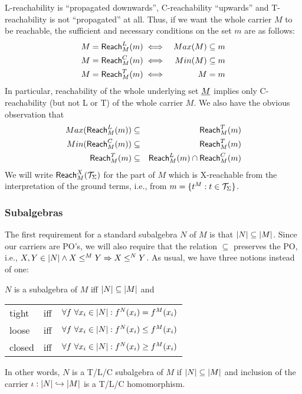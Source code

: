 L-reachability is ``propagated downwards'', C-reachability ``upwards''
and T-reachability is not ``propagated'' at all. Thus, if we want the
whole carrier $M$ to be reachable, the sufficient and necessary conditions
on the set $m$ are as follows:
\begin{eqnarray}
M = \reach LmM & \iff & Max(M)\subseteq m \\
M = \reach CmM & \iff & Min(M) \subseteq m \\
M = \reach TmM & \iff & M = m
\end{eqnarray} 
In particular, reachability of the whole underlying set $\under M$
implies only C-reachability (but not L or T) of the whole carrier $M$.
We also have the obvious observation that
\begin{eqnarray}
Max(\reach LmM) & \subseteq & \reach TmM \\
Min(\reach CmM) & \subseteq & \reach TmM \\
\reach TmM & \subseteq & \reach LmM \cap \reach CmM
\end{eqnarray}
We will write $\reach X{\GTerms}M$ for the part of $M$ which is
X-reachable from the interpretation of the ground terms, i.e., from
$m=\{t^M:t\in\GTerms\}$.

\subsubsection{Subalgebras}

The first requirement for a standard subalgebra $N$ of $M$ is that
$\Card N\subseteq\Card M$. Since our carriers are PO's, we will also
require that the relation $\subseteq$ preserves the PO, i.e.,
$X,Y\in\Card N \land X\po^M Y\impl X\po^N Y$.
As usual,
we have three notions instead of one:
\begin{Definition}
$N$ is a
subalgebra of $M$ iff $\Card N\subseteq \Card M$ and 

\begin{tabular}{lcl}
tight & iff & $\forall f\ \forall x_i\in\Card N : f^N(x_i)=f^M(x_i)$ \\
loose & iff & $\forall f\ \forall x_i\in\Card N : f^N(x_i)\po f^M(x_i)$ \\
closed & iff & $\forall f\ \forall x_i\in\Card N : f^N(x_i)\rpo f^M(x_i)$ 
\end{tabular}
\end{Definition}

In other words, $N$ is a T/L/C subalgebra of $M$ if $\Card N\subseteq
\Card M$ and inclusion of the carrier $\iota:\Card
N\hookrightarrow\Card M$ is a T/L/C homomorphism.

